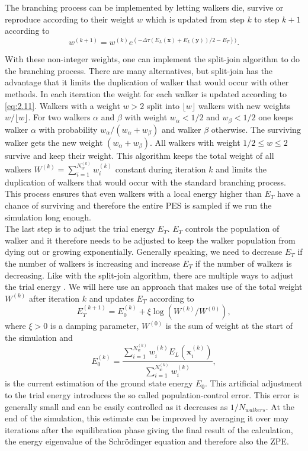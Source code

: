\documentclass [12pt]{report}
\begin{document}
The branching process can be implemented by letting walkers die, survive or reproduce according to their weight $w$ which is updated from step $k$ to step $k+1$ according to 
\begin{equation}\label{eq:2.11} 
w^{(k+1)} = w^{(k)} e^{(-\Delta \tau (E_L(\bm{x}) + E_L(\bm{y}))/2 - E_T))}.
\end{equation}

With these non-integer weights, one can implement the split-join algorithm \cite{split_join} to do the branching process. There are many alternatives, but split-join has the advantage that it limits the duplication of walker that would occur with other methods.
 In each iteration the weight for each walker is updated according to \eqref{eq:2.11}. Walkers with a weight $w > 2$ split into $\lfloor w \rfloor$ walkers with new weights $w/\lfloor w \rfloor$. For two walkers $\alpha$ and $\beta$ with weight $w_\alpha < 1/2$ and $w_\beta < 1/2$ one keeps walker $\alpha$  with probability $w_\alpha/(w_\alpha + w_\beta)$ and walker $\beta$ otherwise. The surviving walker gets the new weight $(w_\alpha + w_\beta)$. All walkers with weight $1/2 \leq w \leq 2$ survive and keep their weight. This algorithm keeps the total weight of all walkers $W^{(k)} =  \sum_{i = 1}^{N_w^{(k)}} w_i^{(k)}$ constant during iteration $k$ and limits the duplication of walkers that would occur with the standard branching process.
 This process ensures that even walkers with a local energy higher than $E_T$ have a chance of surviving and therefore the entire PES is sampled if we run the simulation long enough. \\
The last step is to adjust the trial energy $E_T$. $E_T$ controls the population of walker and it therefore needs to be adjusted to keep the walker population from dying out or growing exponentially. Generally speaking, we need to decrease $E_T$ if the number of walkers is increasing and increase $E_T$ if the number of walkers is decreasing.  Like with the split-join algorithm, there are multiple ways to adjust the trial energy \cite{mccoy,alavi}. We will here use an approach \cite{cyrus} that makes use of the total weight $W^{(k)}$ after iteration $k$ and updates $E_T$ according to
\begin{equation}\label{eq:2.12} 
E_T^{(k+1)} = E_0^{(k)} + \xi \log(W^{(k)}/W^{(0)}),
\end{equation}
where $\xi > 0$ is a damping parameter, $W^{(0)}$ is the sum of weight at the start of the simulation and
\begin{equation}\label{eq:2.13} 
E_0^{(k)} = \frac{\sum_{i = 1}^{N_w^{(k)}} w_{i}^{(k)} E_L(\bm{x}_{i}^{(k)})}{\sum_{i = 1}^{N_w^{(k)}} w_{i}^{(k)} },
\end{equation}
is the current estimation of the ground state energy $E_0$. This artificial adjustment to the trial energy introduces the so called population-control error. This error is generally small and can be easily controlled as it decreases as $1/N_{walkers}$. At the end of the simulation, this estimate can be improved by averaging it over may iterations after the equilibration phase giving the final result of the calculation, the energy eigenvalue of the Schrödinger equation and therefore also the ZPE.
\newpage
\end{document}
